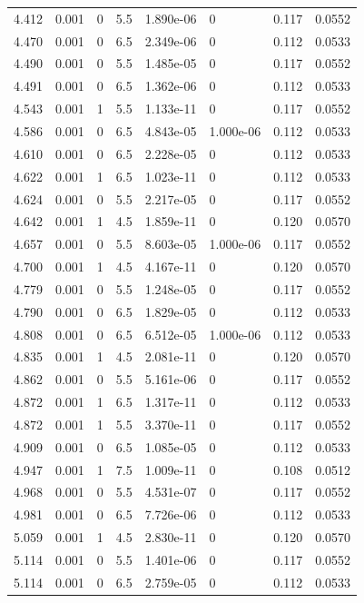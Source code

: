 \documentclass[preview]{standalone}
\begin{document}
{{{{{\begin{tabular}{L{1.2cm}C{1.2cm} C{0.3cm}C{0.5cm} C{1.4cm}C{1.4cm} C{1.4cm}C{1.4cm}}
  4.412  &  0.001  & 0     & 5.5 &  1.890e-06  & 0  & 0.117 &  0.0552   \\ 
  4.470  &  0.001  & 0     & 6.5 &  2.349e-06  & 0  & 0.112 &  0.0533   \\ 
  4.490  &  0.001  & 0     & 5.5 &  1.485e-05  & 0  & 0.117 &  0.0552   \\ 
  4.491  &  0.001  & 0     & 6.5 &  1.362e-06  & 0  & 0.112 &  0.0533   \\ 
  4.543  &  0.001  & 1     & 5.5 &  1.133e-11  & 0  & 0.117 &  0.0552   \\ 
  4.586  &  0.001  & 0     & 6.5 &  4.843e-05  & 1.000e-06  & 0.112 &  0.0533   \\ 
  4.610  &  0.001  & 0     & 6.5 &  2.228e-05  & 0  & 0.112 &  0.0533   \\ 
  4.622  &  0.001  & 1     & 6.5 &  1.023e-11  & 0  & 0.112 &  0.0533   \\ 
  4.624  &  0.001  & 0     & 5.5 &  2.217e-05  & 0  & 0.117 &  0.0552   \\ 
  4.642  &  0.001  & 1     & 4.5 &  1.859e-11  & 0  & 0.120 &  0.0570   \\ 
  4.657  &  0.001  & 0     & 5.5 &  8.603e-05  & 1.000e-06  & 0.117 &  0.0552   \\ 
  4.700  &  0.001  & 1     & 4.5 &  4.167e-11  & 0  & 0.120 &  0.0570   \\ 
  4.779  &  0.001  & 0     & 5.5 &  1.248e-05  & 0  & 0.117 &  0.0552   \\ 
  4.790  &  0.001  & 0     & 6.5 &  1.829e-05  & 0  & 0.112 &  0.0533   \\ 
  4.808  &  0.001  & 0     & 6.5 &  6.512e-05  & 1.000e-06  & 0.112 &  0.0533   \\ 
  4.835  &  0.001  & 1     & 4.5 &  2.081e-11  & 0  & 0.120 &  0.0570   \\ 
  4.862  &  0.001  & 0     & 5.5 &  5.161e-06  & 0  & 0.117 &  0.0552   \\ 
  4.872  &  0.001  & 1     & 6.5 &  1.317e-11  & 0  & 0.112 &  0.0533   \\ 
  4.872  &  0.001  & 1     & 5.5 &  3.370e-11  & 0  & 0.117 &  0.0552   \\ 
  4.909  &  0.001  & 0     & 6.5 &  1.085e-05  & 0  & 0.112 &  0.0533   \\ 
  4.947  &  0.001  & 1     & 7.5 &  1.009e-11  & 0  & 0.108 &  0.0512   \\ 
  4.968  &  0.001  & 0     & 5.5 &  4.531e-07  & 0  & 0.117 &  0.0552   \\ 
  4.981  &  0.001  & 0     & 6.5 &  7.726e-06  & 0  & 0.112 &  0.0533   \\ 
  5.059  &  0.001  & 1     & 4.5 &  2.830e-11  & 0  & 0.120 &  0.0570   \\ 
  5.114  &  0.001  & 0     & 5.5 &  1.401e-06  & 0  & 0.117 &  0.0552   \\ 
  5.114  &  0.001  & 0     & 6.5 &  2.759e-05  & 0  & 0.112 &  0.0533   \\ 
\hline 
\end{tabular} 

}}}}}
\end{document}
